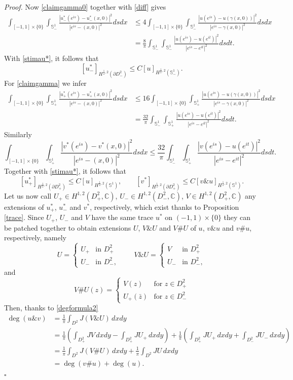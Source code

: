 \documentclass[12pt, a4paper]{article}
\newenvironment{proof}{\noindent\emph{Proof.}}{\hfill$\square$\medskip}
\newcommand{\sph}{\mathbb{S}}
\renewcommand{\(}{\left(}
\renewcommand{\)}{\right)}
\begin{document}
\begin{proof}
Now \eqref{claimgamma0} together with \eqref{diff} gives
\[\begin{split}
\int_{[-1,1]\times \{0\}}\int_{\sph^1_-} \frac{|u^*_-(e^{is})-u^*_-(x,0)|^2}{|e^{is}-(x,0)|^2}ds dx&\le {4} \int_{[-1,1]\times \{0\}}\int_{\sph^1_-} \frac{|u(e^{is})-u(\gamma(x,0))|^2}{|e^{is}-\gamma(x,0)|^2}dsdx\\
&= \frac{8}{\pi} \int_{\sph^1_-}\int_{\sph^1_-}\frac{|u(e^{is})-u(e^{it})|^2}{|e^{is}-e^{it}|^2}dsdt.
\end{split}\]
With \eqref{stimau*}, it follows that
$$[u^*_-]_{H^{\frac12,2}(\partial D^2_-)}\le C[u]_{H^{\frac12,2}(\sph^1_-)}.$$
For \eqref{claimgamma} we infer
\[\begin{split}
\int_{[-1,1]\times \{0\}}\int_{\sph^1_+} \frac{|u^*_+(e^{is})-u^*_+(x,0)|^2}{|e^{is}-(x,0)|^2}dsdx& \le 16\int_{[-1,1]\times \{0\}}\int_{\sph^1_+} \frac{|u(e^{is})-u(\gamma(x,0))|^2}{|e^{is}-\gamma(x,0)|^2}dsdx\\
&=\frac{32}{\pi}  \int_{\sph^1_-}\int_{\sph^1_+}\frac{|u(e^{is})-u(e^{it})|^2}{|e^{is}-e^{it}|^2}dsdt.
\end{split}\]
Similarly
$$\int_{[-1,1]\times \{0\}}\int_{\sph^1_+} \frac{|v^*(e^{is})-v^*(x,0)|^2}{|e^{is}-(x,0)|^2}dsdx\le \frac{32}{\pi} \int_{\sph^1_-}\int_{\sph^1_+}\frac{|v(e^{is})-u(e^{it})|^2}{|e^{is}-e^{it}|^2}dsdt.$$
Together with \eqref{stimau*}, it follows that 
$$[u^*_+]_{H^{\frac12,2}(\partial D^2_+)}\le C[u]_{H^{\frac12,2}(\sph^1)},\qquad [v^*]_{H^{\frac12,2}(\partial D^2_+)}\le C[v\&u]_{H^{\frac12,2}(\sph^1)}.$$
Let us now call $U_+\in H^{1,2}(D^2_+,\mathbb{C})$, $U_-\in H^{1,2}(D^2_-,\mathbb{C})$,  $V\in H^{1,2}(D^2_+,\mathbb{C})$ any extensions of $u^*_+$, $u^*_-$ and $v^*$, respectively, which exist thanks to Proposition \ref{trace}.
Since $U_+$, $U_-$ and $V$ have the same trace $u^*$ on $(-1,1)\times \{0\}$ they can be patched together to obtain extensions $U$, $V\&U$ and $V\#U$ of $u$, $v\&u$ and  $v\#u$, respectively, namely
\[
U=\begin{cases}
U_+&\text{in }D^2_+\\
U_-&\text{in }D^2_-,
\end{cases}
\qquad
V\&U=\begin{cases}
V&\text{in }D^2_+\\
U_-&\text{in }D^2_-,
\end{cases}
\]
and
\[
V\#U(z)=\begin{cases}
V(z)&\text{for }z\in D^2_+\\
U_+(\bar z)&\text{for }z\in D^2_-
\end{cases}
\]
Then, thanks to \eqref{degformula2}
\[\begin{split}
\deg(u\&v)&=\frac{1}{\pi}\int_{D^2} J(V\&U)\, dxdy\\
&=\frac{1}{\pi}\left(\int_{D^2_+} JV\, dxdy-\int_{D^2_+} JU_+\, dxdy\right)+ \frac{1}{\pi}\left(\int_{D^2_+} JU_+\, dxdy+\int_{D^2_-} JU_-\, dxdy\right)\\
&=\frac{1}{\pi}\int_{D^2} J(V\#U)\, dxdy+ \frac{1}{\pi}\int_{D^2} JU\, dxdy\\
&=\deg(v\#u)+\deg(u).
\end{split}\]
\end{proof}
\end{document}
